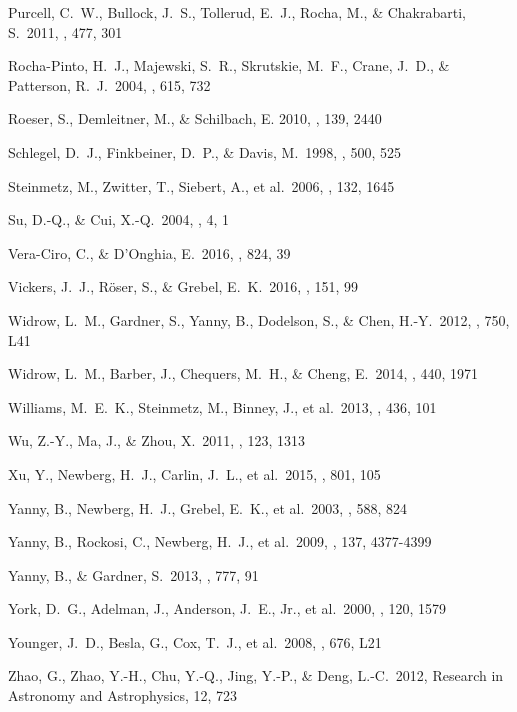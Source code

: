 \documentclass[11pt,preprint]{aastex6}
\begin{document}
\begin{thebibliography}{}
 Purcell, C.~W., Bullock, J.~S., Tollerud, E.~J., Rocha, M., \& Chakrabarti, S.\ 2011, \nat, 477, 301

 Rocha-Pinto, H.~J., Majewski, S.~R., Skrutskie, M.~F., Crane, J.~D., \& Patterson, R.~J.\ 2004, \apj, 615, 732

{Roeser}, S., {Demleitner}, M., \& {Schilbach}, E. 2010, \aj, 139, 2440

 Schlegel, D.~J., Finkbeiner, D.~P., \& Davis, M.\ 1998, \apj, 500, 525

 Steinmetz, M., Zwitter, T., Siebert, A., et al.\ 2006, \aj, 132, 1645 

 Su, D.-Q., \& Cui, X.-Q.\ 2004, \cjaa, 4, 1

 Vera-Ciro, C., \& D'Onghia, E.\ 2016, \apj, 824, 39

 Vickers, J.~J., R{\"o}ser, S., \& Grebel, E.~K.\ 2016, \aj, 151, 99

 Widrow, L.~M., Gardner, S., Yanny, B., Dodelson, S., \& Chen, H.-Y.\ 2012, \apjl, 750, L41

 Widrow, L.~M., Barber, J., Chequers, M.~H., \& Cheng, E.\ 2014, \mnras, 440, 1971

 Williams, M.~E.~K., Steinmetz, M., Binney, J., et al.\ 2013, \mnras, 436, 101

 Wu, Z.-Y., Ma, J., \& Zhou, X.\ 2011, \pasp, 123, 1313

 Xu, Y., Newberg, H.~J., Carlin, J.~L., et al.\ 2015, \apj, 801, 105

 Yanny, B., Newberg, H.~J., Grebel, E.~K., et al.\ 2003, \apj, 588, 824

 Yanny, B., Rockosi, C., Newberg, H.~J., et al.\ 2009, \aj, 137, 4377-4399 

 Yanny, B., \& Gardner, S.\ 2013, \apj, 777, 91

 York, D.~G., Adelman, J., Anderson, J.~E., Jr., et al.\ 2000, \aj, 120, 1579 

 Younger, J.~D., Besla, G., Cox, T.~J., et al.\ 2008, \apjl, 676, L21

 Zhao, G., Zhao, Y.-H., Chu, Y.-Q., Jing, Y.-P., \& Deng, L.-C.\ 2012, Research in Astronomy and Astrophysics, 12, 723

\end{thebibliography}
\end{document}
